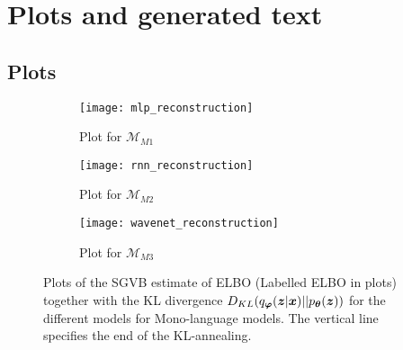 
\appendix
\chapter{Plots and generated text}
\label{Appendix:output}

\section{Plots}

\begin{figure}[!htbp]
  \centering
  \begin{subfigure}[b]{0.55\textwidth}
    \centering
    \texttt{[image: mlp\_reconstruction]}
    \caption{Plot for $\mathcal{M}_{M1}$}
    \label{fig:recon_MLP}
  \end{subfigure}
  \begin{subfigure}[b]{0.55\textwidth}
    \centering
    \texttt{[image: rnn\_reconstruction]}
    \caption{Plot for $\mathcal{M}_{M2}$}
    \label{fig:recon_RNN}
  \end{subfigure}
  \begin{subfigure}[b]{0.55\textwidth}
    \centering
    \texttt{[image: wavenet\_reconstruction]}
    \caption{Plot for $\mathcal{M}_{M3}$}
    \label{fig:recon_WaveNet}
  \end{subfigure}
  \caption{Plots of the SGVB estimate of ELBO (Labelled ELBO in plots)
      together with the KL divergence $D_{KL}(q_{\bm{\varphi}}(\bm{z} |
        \bm{x}) || p_{\bm{\theta}}(\bm{z}))$ for the different models for
      Mono-language models. The
      vertical line specifies the end of the KL-annealing.}
\end{figure}

